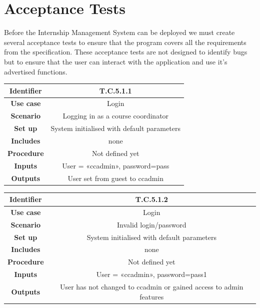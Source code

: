 \documentclass{l3deliverable}
\begin{document}




\section{Acceptance Tests}

Before the Internship Management System can be deployed we must create
several acceptance tests to ensure that the program covers all the
requirements from the specification. These acceptance tests are not
designed to identify bugs but to ensure that the user can interact
with the application and use it's advertised functions.\\

\begin{tabular}{|c|c|}
\hline \textbf{Identifier} & T.C.5.1.1\\
\hline \textbf{Use case} & Login \\
\hline \textbf{Scenario} & Logging in as a course coordinator \\
\hline \textbf{Set up} & System initialised with default parameters\\
\hline \textbf{Includes} & none\\
\hline \textbf{Procedure} & Not defined yet\\
\hline \textbf{Inputs} & User = «ccadmin», password=pass\\
\hline \textbf{Outputs} & User set from guest to ccadmin \\
\hline
\end{tabular}

\begin{tabular}{|c|c|}
\hline \textbf{Identifier} & T.C.5.1.2 \\
\hline \textbf{Use case} & Login\\
\hline \textbf{Scenario} & Invalid login/password\\
\hline \textbf{Set up} & System initialised with default parameters\\
\hline \textbf{Includes} & none\\
\hline \textbf{Procedure} & Not defined yet\\
\hline \textbf{Inputs} & User = «ccadmin», password=pass1\\
\hline \textbf{Outputs} & User has not changed to ccadmin or gained
access to admin features \\
\hline
\end{tabular}
\end{document}
